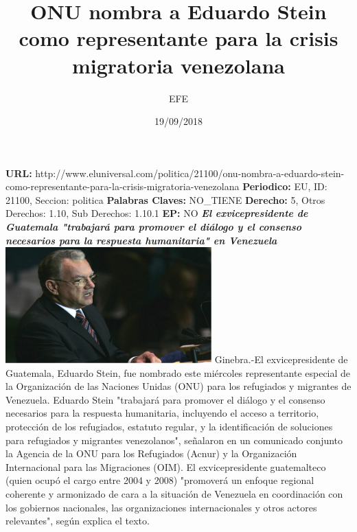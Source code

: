 \documentclass{article}%
\title{\textbf{ONU nombra a Eduardo Stein como representante para la crisis migratoria venezolana}}%
\author{EFE}%
\date{19/09/2018}%
\begin{document}
%
\normalsize%
\maketitle%
\textbf{URL: }%
http://www.eluniversal.com/politica/21100/onu{-}nombra{-}a{-}eduardo{-}stein{-}como{-}representante{-}para{-}la{-}crisis{-}migratoria{-}venezolana\newline%
%
\textbf{Periodico: }%
EU, %
ID: %
21100, %
Seccion: %
politica\newline%
%
\textbf{Palabras Claves: }%
NO\_TIENE\newline%
%
\textbf{Derecho: }%
5, %
Otros Derechos: %
1.10, %
Sub Derechos: %
1.10.1\newline%
%
\textbf{EP: }%
NO\newline%
\newline%
%
\textbf{\textit{El exvicepresidente de Guatemala "trabajará para promover el diálogo y el consenso necesarios para la respuesta humanitaria" en Venezuela}}%
\newline%
\newline%
%
\includegraphics[width=300px]{122.jpg}%
\newline%
%
Ginebra.{-}El exvicepresidente de Guatemala, Eduardo Stein, fue nombrado este miércoles representante especial de la Organización de las Naciones Unidas (ONU) para los refugiados y migrantes de Venezuela.%
\newline%
%
Eduardo Stein "trabajará para promover el diálogo y el consenso necesarios para la respuesta humanitaria, incluyendo el acceso a territorio, protección de los refugiados, estatuto regular, y la identificación de soluciones para refugiados y migrantes venezolanos", señalaron en un comunicado conjunto la Agencia de la ONU para los Refugiados (Acnur) y la Organización Internacional para las Migraciones (OIM).%
\newline%
%
El exvicepresidente guatemalteco (quien ocupó el cargo entre 2004 y 2008) "promoverá un enfoque regional coherente y armonizado de cara a la situación de Venezuela en coordinación con los gobiernos nacionales, las organizaciones internacionales y otros actores relevantes", según explica el texto.%
\end{document}
